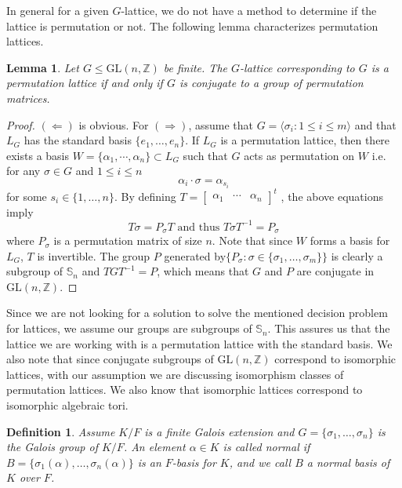 \documentclass[12pt]{article}
\theoremstyle{plain}
\newtheorem{lemma}[theorem]{Lemma}
\newtheorem{definition}[theorem]{Definition}
\newcommand{\Z}{\ensuremath{\mathbb{Z}}}
\begin{document}
In general for a given $G$-lattice, we do not have a method to
determine if the lattice is permutation or not.  The following lemma
characterizes permutation lattices.
\begin{lemma}\label{PermLatChar}
  Let $ G \leq \mathrm{GL}(n,\mathbb{Z})$ be finite. The $G$-lattice
  corresponding to $G$ is a permutation lattice if and only if $G$ is
  conjugate to a group of permutation matrices.
\end{lemma} 
\begin{proof}
$(\Leftarrow)$ is obvious.
For $(\Rightarrow)$, assume that $G = \langle \sigma_i: 1\leq i \leq m\rangle$ and that $L_G$ has the standard basis $\lbrace e_1, \ldots , e_n \rbrace$. If $L_G$ is a permutation lattice, then there exists a basis $W=\lbrace \alpha_1 , \cdots, \alpha_n \rbrace \subset L_G$ such that $ G$ acts as permutation on   $W$ i.e. for any $\sigma \in G$ and $1 \leq i \leq n$
\begin{displaymath}\label{sigma}
\alpha_i \cdot \sigma = \alpha_{s_i} 
\end{displaymath}
 for some $s_i \in  \lbrace 1, \ldots, n \rbrace$. By defining $T = \begin{bmatrix}
\alpha_1 & \cdots & \alpha_n
\end{bmatrix}^t $ , the above equations imply 
$$   T\sigma = P_{\sigma} T \,\, \text{and thus} \,\, T\sigma T^{-1} = P_{\sigma}$$ where $P_{\sigma}$ is a permutation matrix of size $n$. Note that since $W$ forms a basis for $L_G$, $T$ is invertible. The group $P$ generated by$\lbrace P_{\sigma}: \sigma \in \lbrace \sigma_1, \ldots, \sigma_m \rbrace \rbrace$ is clearly a subgroup of $\mathbb{S}_n$ and $TGT^{-1}= P$, which means that $G$ and $P$ are conjugate in $\mathrm{GL}(n,\Z)$. 
\end{proof}


Since we are not looking for a solution to solve the mentioned
decision problem for lattices, we assume our groups are subgroups of
$\mathbb{S}_n$. This assures us that the lattice we are working with
is a permutation lattice with the standard basis. We also note that
since conjugate subgroups of $\mathrm{GL}(n,\Z)$ correspond to
isomorphic lattices, with our assumption we are discussing isomorphism
classes of permutation lattices. We also know that isomorphic lattices
correspond to isomorphic algebraic tori.

\begin{definition}
  Assume $K/F$ is a finite Galois extension and $G = \lbrace \sigma_1,
  \ldots , \sigma_n \rbrace$ is the Galois group of $K/F$. An element
  $\alpha \in K$ is called normal if $B = \lbrace \sigma_1(\alpha),
  \ldots , \sigma_n(\alpha) \rbrace$ is an $F$-basis for $K$, and we
  call $B$ a normal basis of $K$ over $F$.
\end{definition} 
\end{document}
